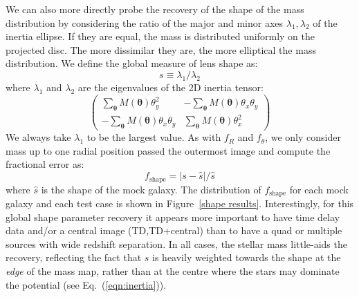 \documentclass[galley,usenatbib]{mn2e}
\renewcommand{\vec}[1]{\ensuremath{\boldsymbol{#1}}}
\newcommand{\figref}[1] {Figure~\ref{#1}}
\newcommand{\eqnref}[1] {Eq.~(\ref{#1})}
\begin{document}
We can also more directly probe the recovery of the shape of the mass
distribution by considering the ratio of the major and minor axes $\lambda_1,
\lambda_2$ of the inertia ellipse. If they are equal, the mass is distributed
uniformly on the projected disc. The more dissimilar they are, the more
elliptical the mass distribution. We define the global measure of lens shape as:
%
\begin{equation} 
    s \equiv \lambda_1/\lambda_2
\end{equation} 
%
where $\lambda_1$ and $\lambda_2$ are the eigenvalues of the 2D inertia tensor:
%
\begin{equation}
\left(
\begin{matrix}
   \sum_{\vec\theta} M(\vec\theta) \theta^2_y 
    & - \sum_{\vec\theta} M(\vec\theta) \theta_x \theta_y \\
    - \sum_{\vec\theta} M(\vec\theta) \theta_x \theta_y
    & \sum_{\vec\theta} M(\vec\theta) \theta^2_x
\end{matrix}
\right)
    \label{eqn:inertia}
\end{equation}
%
We always take $\lambda_1$ to be the largest value. As with $f_R$ and
$f_\theta$, we only consider mass up to one radial position passed the
outermost image and compute the fractional error as:
%
\begin{equation} \label{ferror shape}
  f_\mathrm{shape} = \left|s - \widehat s\right|  / \widehat s
\end{equation}
%
where $\widehat s$ is the shape of the mock galaxy. The distribution of
$f_\mathrm{shape}$ for each mock galaxy and each test case is shown in
\figref{shape results}.  Interestingly, for this global shape parameter
recovery it appears more important to have time delay data and/or a central
image (TD,TD+central) than to have a quad or multiple sources with wide redshift
separation. In all cases, the stellar mass little-aids the recovery, reflecting
the fact that $s$ is heavily weighted towards the shape at the {\it edge} of
the mass map, rather than at the centre where the stars may dominate the
potential (see \eqnref{eqn:inertia}).
\end{document}
